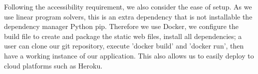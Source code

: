 Following the accessibility requirement, we also consider the ease of setup. As we use linear program solvers, this is an extra dependency that is not installable the dependency manager Python pip. Therefore we use Docker, we configure the build file to create and package the static web files, install all dependencies; a user can clone our git repository, execute 'docker build' and 'docker run', then have a working instance of our application. This also allows us to easily deploy to cloud platforms such as Heroku.